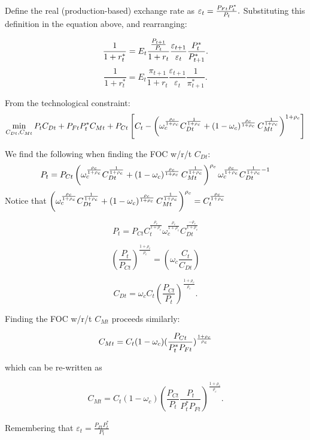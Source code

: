 \documentclass{article}
\begin{document}
Define the real (production-based) exchange rate as $\varepsilon _{t}=\frac{%
P_{Ft}P_{t}^{\ast }}{P_{t}}.$ Substituting this definition in the equation
above, and rearranging:

\[
\frac{1}{1+r_{t}^{\ast }}=E_{t}\frac{\frac{P_{t+1}}{P_{t}}}{1+r_{t}}\frac{%
\varepsilon _{t+1}}{\varepsilon _{t}}\frac{P_{t}^{\ast }}{P_{t+1}^{\ast }}. 
\]%
\[
\frac{1}{1+r_{t}^{\ast }}=E_{t}\frac{\pi _{t+1}}{1+r_{t}}\frac{\varepsilon
_{t+1}}{\varepsilon _{t}}\frac{1}{\pi _{t+1}^{\ast }}. 
\]

From the technological constraint: 
\[
\min_{C_{Dt},C_{Mt}}P_{t}C_{Dt}+P_{Ft}P_{t}^{\ast }C_{Mt}+P_{Ct}\left[
C_{t}-\left( \omega _{c}^{\frac{\rho _{c}}{1+\rho _{c}}}C_{Dt}^{\frac{1}{%
1+\rho _{c}}}+\left( 1-\omega _{c}\right) ^{\frac{\rho _{c}}{1+\rho _{c}}%
}C_{Mt}^{\frac{1}{1+\rho _{c}}}\right) ^{1+\rho _{c}}\right] 
\]

We find the following when finding the FOC w/r/t $C_{Dt}$:%
\[
P_{t}=P_{Ct}{}\left( \omega _{c}^{\frac{\rho _{c}}{1+\rho _{c}}}C_{Dt}^{%
\frac{1}{1+\rho _{c}}}+\left( 1-\omega _{c}\right) ^{\frac{\rho _{c}}{1+\rho
_{c}}}C_{Mt}^{\frac{1}{1+\rho _{c}}}\right) ^{\rho _{c}}\omega _{c}^{\frac{%
\rho _{c}}{1+\rho _{c}}}C_{Dt}^{\frac{1}{1+\rho _{c}}-1} 
\]%
Notice that $\left( \omega _{c}^{\frac{\rho _{c}}{1+\rho _{c}}}C_{Dt}^{\frac{%
1}{1+\rho _{c}}}+\left( 1-\omega _{c}\right) ^{\frac{\rho _{c}}{1+\rho _{c}}%
}C_{Mt}^{\frac{1}{1+\rho _{c}}}\right) ^{\rho _{c}}=C_{t}^{\frac{\rho _{c}}{%
1+\rho _{c}}}$

\bigskip 
\[
P_{t}=P_{Ct}{}C_{t}^{\frac{\rho _{c}}{1+\rho _{c}}}\omega _{c}^{\frac{\rho
_{c}}{1+\rho _{c}}}C_{Dt}^{\frac{-\rho _{c}}{1+\rho _{c}}} 
\]

\[
\left( \frac{P_{t}}{P_{Ct}}\right) ^{\frac{1+\rho _{c}}{\rho _{c}}}={}\left(
\omega _{c}\frac{C_{t}}{C_{Dt}}\right) 
\]

\[
C_{Dt}={}\omega _{c}C_{t}\left( \frac{P_{Ct}}{P_{t}}\right) ^{\frac{1+\rho
_{c}}{\rho _{c}}}. 
\]

Finding the FOC w/r/t $C_{Mt}$ proceeds similarly:

\[
C_{Mt}=C_{t}(1-\omega _{c})(\frac{P_{Ct}}{P_{t}^{\ast }P_{Ft}})^{\frac{%
1+\rho _{c}}{\rho _{c}}} 
\]

which can be re-written as

\[
C_{Mt}=C_{t}(1-\omega _{c})(\frac{P_{Ct}}{P_{t}}\frac{P_{t}}{P_{t}^{\ast
}P_{Ft}})^{\frac{1+\rho _{c}}{\rho _{c}}}. 
\]

Remembering that $\varepsilon _{t}=\frac{P_{Ft}P_{t}^{\ast }}{P_{t}}$
\end{document}
